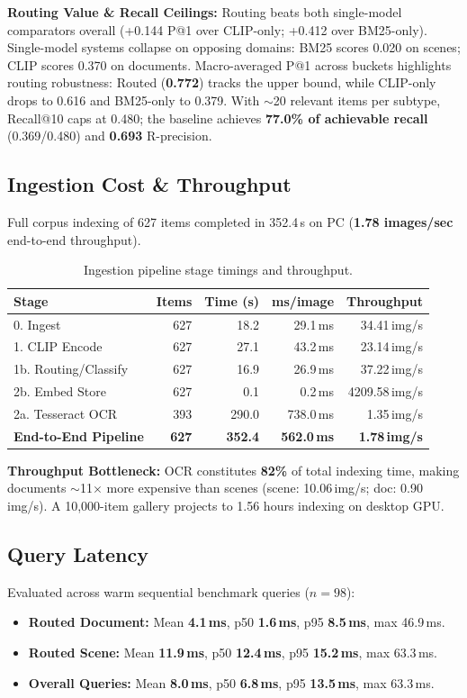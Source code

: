 \documentclass[10.5pt,twocolumn]{article}
\begin{document}
\textbf{Routing Value \& Recall Ceilings:} Routing beats both single-model comparators overall (+0.144 P@1 over CLIP-only; +0.412 over BM25-only). Single-model systems collapse on opposing domains: BM25 scores 0.020 on scenes; CLIP scores 0.370 on documents. Macro-averaged P@1 across buckets highlights routing robustness: Routed (\textbf{0.772}) tracks the upper bound, while CLIP-only drops to 0.616 and BM25-only to 0.379. With $\sim$20 relevant items per subtype, Recall@10 caps at 0.480; the baseline achieves \textbf{77.0\% of achievable recall} (0.369/0.480) and \textbf{0.693} R-precision.

\subsection{Ingestion Cost \& Throughput}
Full corpus indexing of 627 items completed in 352.4\,s on PC (\textbf{1.78 images/sec} end-to-end throughput).

\begin{table}[htbp]
\centering
\scriptsize
\setlength{\tabcolsep}{2.0pt}
\begin{tabular}{lrrrr}
\toprule
\textbf{Stage} & \textbf{Items} & \textbf{Time (s)} & \textbf{ms/image} & \textbf{Throughput} \\
\midrule
0. Ingest & 627 & 18.2 & 29.1\,ms & 34.41\,img/s \\
1. CLIP Encode & 627 & 27.1 & 43.2\,ms & 23.14\,img/s \\
1b. Routing/Classify & 627 & 16.9 & 26.9\,ms & 37.22\,img/s \\
2b. Embed Store & 627 & 0.1 & 0.2\,ms & 4209.58\,img/s \\
2a. Tesseract OCR & 393 & 290.0 & 738.0\,ms & 1.35\,img/s \\
\midrule
\textbf{End-to-End Pipeline} & \textbf{627} & \textbf{352.4} & \textbf{562.0\,ms} & \textbf{1.78\,img/s} \\
\bottomrule
\end{tabular}
\caption{Ingestion pipeline stage timings and throughput.}
\label{tab:ingest}
\end{table}

\textbf{Throughput Bottleneck:} OCR constitutes \textbf{82\%} of total indexing time, making documents $\sim$11$\times$ more expensive than scenes (scene: 10.06\,img/s; doc: 0.90\,img/s). A 10,000-item gallery projects to 1.56 hours indexing on desktop GPU.

\subsection{Query Latency}
Evaluated across warm sequential benchmark queries ($n=98$):
\begin{itemize}
    \item \textbf{Routed Document:} Mean \textbf{4.1\,ms}, p50 \textbf{1.6\,ms}, p95 \textbf{8.5\,ms}, max 46.9\,ms.
    \item \textbf{Routed Scene:} Mean \textbf{11.9\,ms}, p50 \textbf{12.4\,ms}, p95 \textbf{15.2\,ms}, max 63.3\,ms.
    \item \textbf{Overall Queries:} Mean \textbf{8.0\,ms}, p50 \textbf{6.8\,ms}, p95 \textbf{13.5\,ms}, max 63.3\,ms.
\end{itemize}
\end{document}
